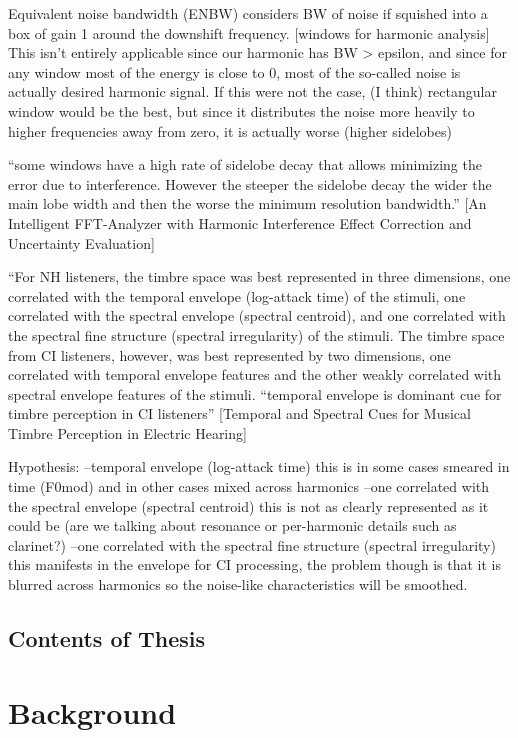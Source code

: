 \documentclass [11pt, proquest] {uwthesis}[2015/03/03]
\begin{document}
Equivalent noise bandwidth (ENBW) considers BW of noise if squished into a box of gain 1 around the downshift frequency.  [windows for harmonic analysis] This isn't entirely applicable since our harmonic has BW > epsilon, and since for any window most of the energy is close to 0, most of the so-called noise is actually desired harmonic signal.  If this were not the case, (I think) rectangular window would be the best, but since it distributes the noise more heavily to higher frequencies away from zero, it is actually worse (higher sidelobes)

``some windows have a high rate of sidelobe decay that allows minimizing the error due to interference. However the steeper the sidelobe decay
the wider the main lobe width and then the worse the minimum resolution bandwidth.'' [An Intelligent FFT-Analyzer with Harmonic Interference Effect Correction and Uncertainty Evaluation]

``For NH listeners, the timbre space was best represented in three dimensions, one correlated with the temporal envelope (log-attack time) of the stimuli, one correlated with the spectral envelope (spectral centroid), and one correlated with the spectral fine structure (spectral irregularity) of the stimuli. The timbre space from CI listeners, however, was best represented by two dimensions, one correlated with temporal envelope features and the other weakly correlated with spectral envelope features of the stimuli. 
``temporal envelope is dominant cue for timbre perception in CI listeners''
[Temporal and Spectral Cues for Musical Timbre
Perception in Electric Hearing]

Hypothesis:
--temporal envelope (log-attack time)
this is in some cases smeared in time (F0mod) and in other cases mixed across harmonics
--one correlated with the spectral envelope (spectral centroid)
this is not as clearly represented as it could be (are we talking about resonance or per-harmonic details such as clarinet?)
--one correlated with the spectral fine structure (spectral irregularity)
this manifests in the envelope for CI processing, the problem though is that it is blurred across harmonics so the noise-like characteristics will be smoothed.

\section{Contents of Thesis}


\chapter{Background}
\end{document}
